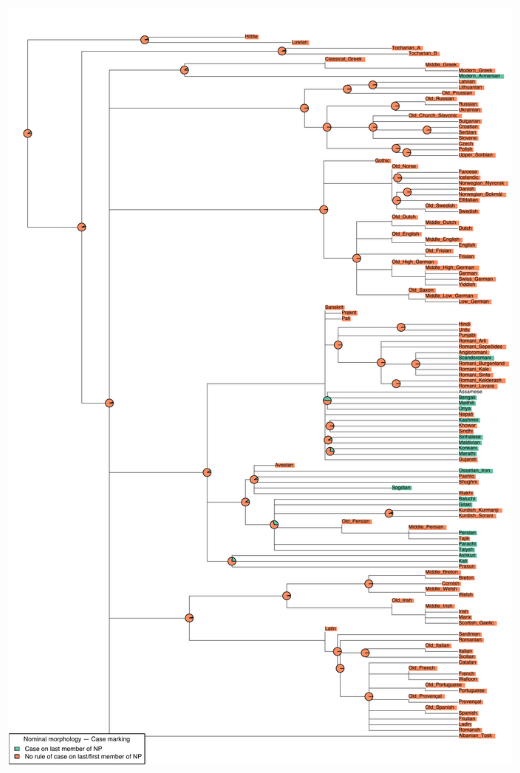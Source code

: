 \includegraphics[width=.9\linewidth]{supp-graphics/NominalmorphologyCasemarkingCASEFIRSTNominalmorphologyCasemarkingCASELAST.pdf}

